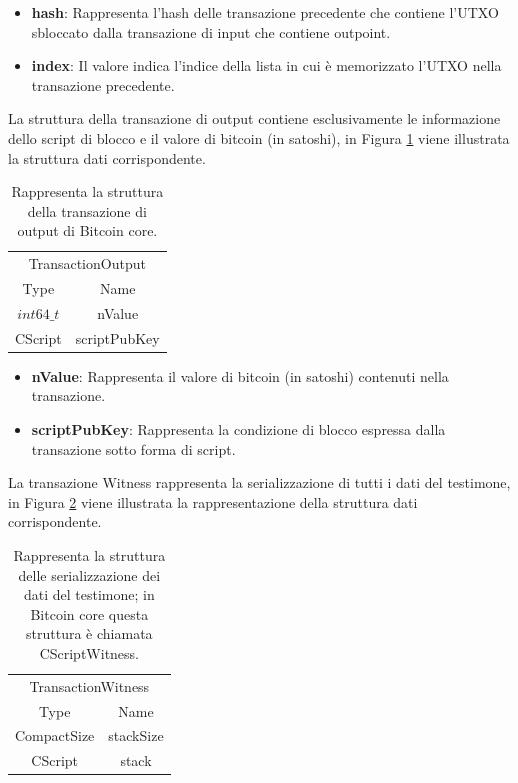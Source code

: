 \begin{itemize}
  \item {\bf hash\/}:  Rappresenta l’hash delle transazione precedente che contiene l’UTXO sbloccato dalla transazione di input che contiene outpoint.
  \item {\bf index\/}: Il valore indica l’indice della lista in cui è memorizzato l’UTXO nella transazione precedente.
\end{itemize}

La struttura della transazione di output contiene esclusivamente le informazione dello script di blocco e il valore di bitcoin (in satoshi), in Figura \ref{tab:transactionOutput} viene illustrata la struttura dati corrispondente.

\begin{table}[H]
       \centering\small
           \begin{tabular}{cc}
               \toprule
                 \multicolumn{2}{c}{TransactionOutput} \\
                 \cmidrule(lr){1-2}
                 \multicolumn{1}{c}{Type} & \multicolumn{1}{c}{Name} \\
               \midrule
               $int64\_t$ & nValue   \\
               CScript & scriptPubKey \\
               \bottomrule
       \end{tabular}
       \caption{Rappresenta la struttura della transazione di output di Bitcoin core.\label{tab:transactionOutput}}
   \end{table}

\begin{itemize}
  \item {\bf nValue\/}: Rappresenta il valore di bitcoin (in satoshi) contenuti nella transazione.
  \item {\bf scriptPubKey\/}: Rappresenta la condizione di blocco espressa dalla transazione sotto forma di script.
\end{itemize}

La transazione Witness rappresenta la serializzazione di tutti i dati del testimone, in Figura \ref{tab:witnesstxbitcoinc} viene illustrata la rappresentazione della struttura dati corrispondente.

\begin{table}[H]
       \centering\small
           \begin{tabular}{cc}
               \toprule
                 \multicolumn{2}{c}{TransactionWitness} \\
                 \cmidrule(lr){1-2}
                 \multicolumn{1}{c}{Type} & \multicolumn{1}{c}{Name} \\
               \midrule
               CompactSize & stackSize   \\
               CScript & stack \\
               \bottomrule
       \end{tabular}
       \caption{Rappresenta la struttura delle serializzazione dei dati del testimone; in Bitcoin core questa struttura è chiamata CScriptWitness.\label{tab:witnesstxbitcoinc}}
   \end{table}

